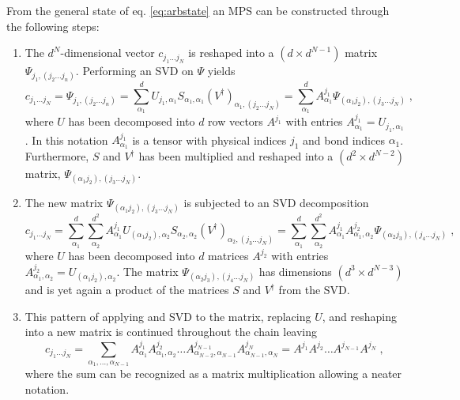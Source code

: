 From the general state of eq. \eqref{eq:arbstate} an MPS can be constructed through the following steps:
\begin{enumerate}
\item
The $d^N$-dimensional vector $c_{j_1 \ldots j_N}$ is reshaped into a $(d \times d^{N-1})$ matrix $\Psi_{j_1 , (j_2 \ldots j_n)}$. Performing an SVD on $\Psi$ yields
\begin{equation}
	c_{j_1 \ldots j_N} = \Psi_{j_1 , (j_2 \ldots j_n)} = \sum_{\alpha_1}^{d} U_{j_1 , \alpha_1} S_{\alpha_1 , \alpha_1} (V^{\dag})_{\alpha_1 , (j_2 \ldots j_N)} = \sum_{\alpha_1}^{d} A_{\alpha_1}^{j_1} \Psi_{(\alpha_1 j_2),(j_3 \ldots j_N)} \; ,
\end{equation}
where $U$ has been decomposed into $d$ row vectors $A^{j_1}$ with entries $A_{\alpha_1}^{j_1} = U_{j_1 , \alpha_1}$. In this notation $A_{\alpha_1}^{j_1}$ is a tensor with physical indices $j_1$ and bond indices $\alpha_1$. Furthermore, $S$ and $V^{\dag}$ has been multiplied and reshaped into a $(d^2 \times d^{N-2})$ matrix, $\Psi_{(\alpha_1 j_2),(j_3 \ldots j_N)}$.

\item
The new matrix $\Psi_{(\alpha_1 j_2),(j_3 \ldots j_N)}$ is subjected to an SVD decomposition
\begin{equation}
	c_{j_1 \ldots j_N} = \sum_{\alpha_1}^{d} \sum_{\alpha_2}^{d^2} A_{\alpha_1}^{j_1} U_{(\alpha_1 j_2) , \alpha_2} S_{\alpha_2 , \alpha_2} (V^{\dag})_{\alpha_2 , (j_3 \ldots j_N)} = \sum_{\alpha_1}^{d} \sum_{\alpha_2}^{d^2} A_{\alpha_1}^{j_1} A_{\alpha_1 , \alpha_2}^{j_2} \Psi_{(\alpha_2 j_3),(j_4 \ldots j_N)} \; ,
\end{equation}
where $U$ has been decomposed into $d$ matrices $A^{j_2}$ with entries $A_{\alpha_1 , \alpha_2}^{j_2} = U_{(\alpha_1 j_2) , \alpha_2}$. The matrix $\Psi_{(\alpha_2 j_3),(j_4 \ldots j_N)}$ has dimensions $(d^3 \times d^{N-3})$ and is yet again a product of the matrices $S$ and $V^{\dag}$ from the SVD.

\item
This pattern of applying and SVD to the matrix, replacing $U$, and reshaping into a new matrix is continued throughout the chain leaving 
\begin{equation}
	c_{j_1 \ldots j_N} = \sum_{\alpha_1 , \ldots , \alpha_{N-1}} A_{\alpha_1}^{j_1} A_{\alpha_1 , \alpha_2}^{j_2} \ldots A_{\alpha_{N-2} ,\alpha_{N-1}}^{j_{N-1}} A_{\alpha_{N-1} ,\alpha_{N}}^{j_{N}} = A^{j_1} A^{j_2} \ldots A^{j_{N-1}} A^{j_{N}} \; ,
\end{equation}
where the sum can be recognized as a matrix multiplication allowing a neater notation.
\end{enumerate}
